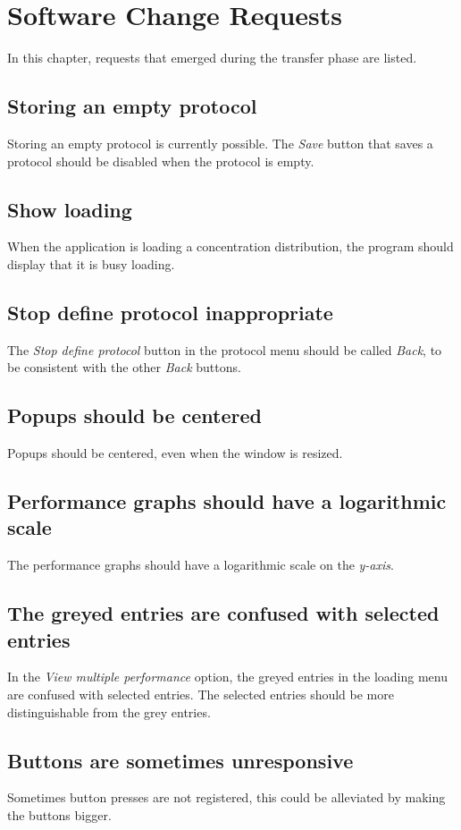 \chapter{Software Change Requests}
\label{chap:changes}

In this chapter, requests that emerged during the transfer phase are listed.

\section*{Storing an empty protocol}
Storing an empty protocol is currently possible. The \emph{Save} button that saves a protocol should be disabled when the protocol is empty.

\section*{Show loading}
When the application is loading a concentration distribution, the program should display that it is busy loading.

\section*{Stop define protocol inappropriate}
The \emph{Stop define protocol} button in the protocol menu should be called \emph{Back}, to be consistent with the other \emph{Back} buttons.

\section*{Popups should be centered}
Popups should be centered, even when the window is resized.

\section*{Performance graphs should have a logarithmic scale}
The performance graphs should have a logarithmic scale on the \emph{y-axis}.

\section*{The greyed entries are confused with selected entries}
In the \emph{View multiple performance} option, the greyed entries in the loading menu are confused with selected entries. The selected entries should be more distinguishable from the grey entries.

\section*{Buttons are sometimes unresponsive}
Sometimes button presses are not registered, this could be alleviated by making the buttons bigger.

